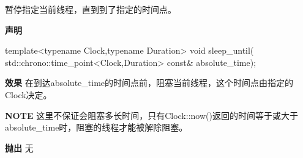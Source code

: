
暂停指定当前线程，直到到了指定的时间点。

\textbf{声明}

\begin{cpp}
template<typename Clock,typename Duration>
void sleep_until(
    std::chrono::time_point<Clock,Duration> const& absolute_time);
\end{cpp}

\textbf{效果}
在到达absolute\_time的时间点前，阻塞当前线程，这个时间点由指定的Clock决定。

\textbf{NOTE} 这里不保证会阻塞多长时间，只有Clock::now()返回的时间等于或大于absolute\_time时，阻塞的线程才能被解除阻塞。

\textbf{抛出}
无